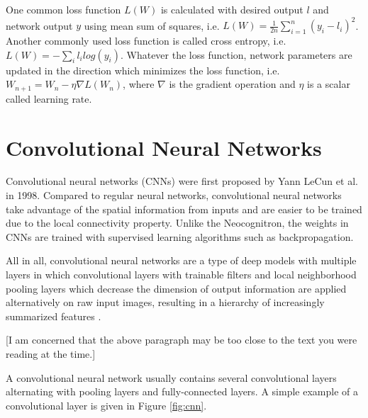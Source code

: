  One common loss function \(L(W)\) is calculated with desired output \(l\) and network output \(y\) using mean sum of squares, i.e. \(L(W) = \frac{1}{2n}\sum_{i = 1}^{n} (y_{i}-l_{i})^2\). Another commonly used loss function is called cross entropy, i.e. \(L(W) = -\sum_{i} l_{i}log(y_{i})\). Whatever the loss function, network parameters are updated in the direction which minimizes the loss function, i.e. \(W_{n+1} = W_{n} - \eta\nabla L(W_{n})\), where \(\nabla\) is the gradient operation and \(\eta\) is a scalar called learning rate. 


\section{Convolutional Neural Networks}

Convolutional neural networks (CNNs) were first proposed by Yann LeCun et al. \cite{lecun_gradient-based_1998} in 1998. Compared to regular neural networks, convolutional neural networks take advantage of the spatial information from inputs and are easier to be trained due to the local connectivity property. Unlike the Neocognitron, the weights in CNNs are trained with supervised learning algorithms such as backpropagation.

All in all, convolutional neural networks are a type of deep models with multiple layers in which convolutional layers with trainable filters and local neighborhood pooling layers which decrease the dimension of output information are applied alternatively on raw input images, resulting in a hierarchy of increasingly summarized features \cite{ji_3d_2013}. 

[I am concerned that the above paragraph may be too close to the text you were reading at the time.]

A convolutional neural network usually contains several convolutional layers alternating with pooling layers and fully-connected layers. A simple example of a convolutional layer is given in Figure \ref{fig:cnn}. 

